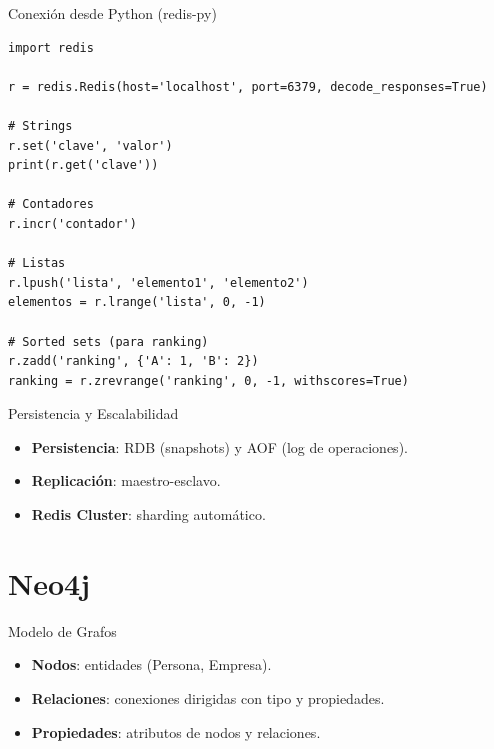 \documentclass[aspectratio=169, 10pt, xcolor=table]{beamer}
\begin{document}
\begin{frame}[fragile]{Conexión desde Python (redis-py)}
    \begin{lstlisting}[style=python]
import redis

r = redis.Redis(host='localhost', port=6379, decode_responses=True)

# Strings
r.set('clave', 'valor')
print(r.get('clave'))

# Contadores
r.incr('contador')

# Listas
r.lpush('lista', 'elemento1', 'elemento2')
elementos = r.lrange('lista', 0, -1)

# Sorted sets (para ranking)
r.zadd('ranking', {'A': 1, 'B': 2})
ranking = r.zrevrange('ranking', 0, -1, withscores=True)
    \end{lstlisting}
\end{frame}

\begin{frame}{Persistencia y Escalabilidad}
    \begin{itemize}
        \item \textbf{Persistencia}: RDB (snapshots) y AOF (log de operaciones).
        \item \textbf{Replicación}: maestro-esclavo.
        \item \textbf{Redis Cluster}: sharding automático.
    \end{itemize}
\end{frame}

\section{Neo4j}

\begin{frame}{Modelo de Grafos}
    \begin{itemize}
        \item \textbf{Nodos}: entidades (Persona, Empresa).
        \item \textbf{Relaciones}: conexiones dirigidas con tipo y propiedades.
        \item \textbf{Propiedades}: atributos de nodos y relaciones.
    \end{itemize}
\end{frame}
\end{document}
